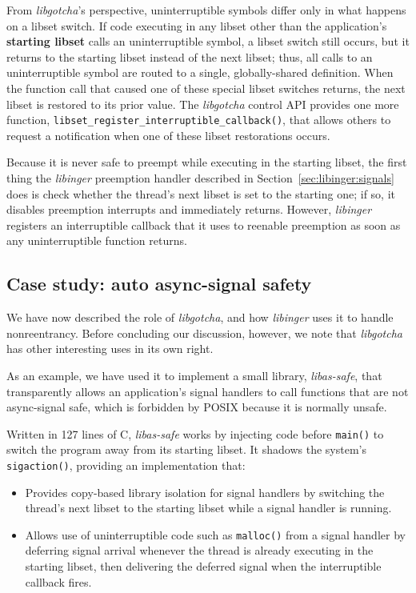From \textit{libgotcha}'s perspective, uninterruptible symbols differ only in what
happens on a libset switch.  If code executing in any libset other than the
application's \textbf{starting libset} calls an uninterruptible symbol, a libset
switch still occurs, but it returns to the starting libset instead of the next
libset; thus, all calls to an uninterruptible symbol are routed to a single,
globally-shared definition.  When the function call that caused one of these special
libset switches returns, the next libset is restored to its prior value.  The
\textit{libgotcha} control API provides one more function,
\texttt{libset\_register\_interruptible\_callback()}, that allows others to request
a notification when one of these libset restorations occurs.

Because it is never safe to preempt while executing in the starting libset, the
first thing the \textit{libinger} preemption handler described in
Section~\ref{sec:libinger:signals} does is check whether the thread's next libset
is set to the starting one; if so, it disables preemption interrupts and immediately
returns.  However, \textit{libinger} registers an interruptible callback that it uses
to reenable preemption as soon as any uninterruptible function returns.



\subsection{Case study: auto async-signal safety}

We have now described the role of \textit{libgotcha}, and how \textit{libinger} uses
it to handle nonreentrancy.  Before concluding our discussion, however, we note that
\textit{libgotcha} has other interesting uses in its own right.

As an example, we have used it to implement a small library, \textit{libas-safe},
that transparently allows an application's signal handlers to call functions that
are not async-signal safe, which is forbidden by POSIX because it is normally unsafe.

Written in 127 lines of C, \textit{libas-safe} works by injecting code before
\texttt{main()} to switch the program away from its starting libset.  It shadows
the system's \texttt{sigaction()}, providing an implementation that:
\begin{itemize}
\item Provides copy-based library isolation for signal handlers by switching the
	thread's next libset to the starting libset while a signal handler is running.
\item Allows use of uninterruptible code such as \texttt{malloc()} from a signal
	handler by deferring signal arrival whenever the thread is already executing
	in the starting libset, then delivering the deferred signal when the
	interruptible callback fires.
\end{itemize}

